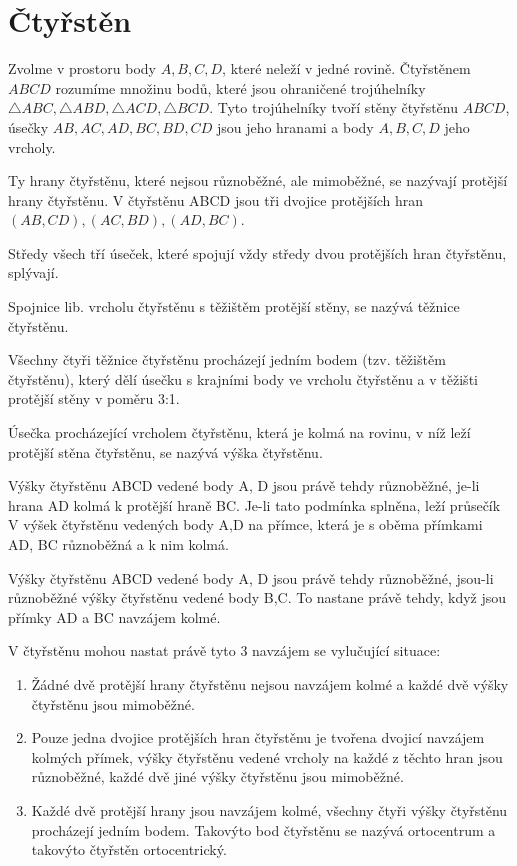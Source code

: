 
\let\braceru=\relax \let\bracelu=\relax 
\def\o#1{\setbox0=
	\hbox{$\kern2pt\overbrace{\kern-2pt#1\kern-2pt}\kern2pt$}\ht0=2.1ex\box0}
\def\to#1{\hbox{#1\rlap{\t{}}}}
\def\rad{\rm{rad}}
\def\f{\frac}
\section{Čtyřstěn}
\Def Zvolme v prostoru body $A,B,C,D$, které neleží
v jedné rovině. Čtyřstěnem $ABCD$ rozumíme
množinu bodů, které jsou ohraničené
trojúhelníky $\triangle ABC , \triangle ABD , \triangle ACD , \triangle BCD$. Tyto
trojúhelníky tvoří stěny čtyřstěnu $ABCD$, úsečky
$AB, AC, AD, BC, BD, CD$ jsou jeho hranami a
body $A,B,C,D$ jeho vrcholy.

\Poz Ty hrany čtyřstěnu, které nejsou různoběžné, ale
mimoběžné, se nazývají protější hrany čtyřstěnu. V čtyřstěnu ABCD jsou tři dvojice
protějších hran $(AB, CD), (AC,BD), (AD,BC)$.

\V Středy všech tří úseček, které spojují vždy středy dvou protějších hran čtyřstěnu,
splývají.

\Def Spojnice lib. vrcholu čtyřstěnu s těžištěm protější stěny, se nazývá těžnice čtyřstěnu.

\V Všechny čtyři těžnice čtyřstěnu procházejí jedním bodem (tzv. těžištěm čtyřstěnu), který
dělí úsečku s krajními body ve vrcholu čtyřstěnu a v těžišti protější stěny v poměru 3:1.

\Def Úsečka procházející vrcholem čtyřstěnu, která je kolmá na rovinu, v níž leží protější stěna
čtyřstěnu, se nazývá výška čtyřstěnu.

\V Výšky čtyřstěnu ABCD vedené body A, D jsou právě tehdy různoběžné, je-li hrana AD
kolmá k protější hraně BC. Je-li tato podmínka splněna, leží průsečík V výšek čtyřstěnu
vedených body A,D na přímce, která je s oběma přímkami AD, BC různoběžná a k nim
kolmá.

\Poz Výšky čtyřstěnu ABCD vedené body A, D jsou právě tehdy různoběžné, jsou-li
různoběžné výšky čtyřstěnu vedené body B,C. To nastane právě tehdy, když jsou přímky
AD a BC navzájem kolmé.

\V V čtyřstěnu mohou nastat právě tyto 3 navzájem se vylučující situace:
\begin{enumerate}
\item Žádné dvě protější hrany čtyřstěnu nejsou navzájem kolmé a každé dvě výšky
čtyřstěnu jsou mimoběžné.
\item Pouze jedna dvojice protějších hran čtyřstěnu je tvořena dvojicí navzájem kolmých
přímek, výšky čtyřstěnu vedené vrcholy na každé z těchto hran jsou různoběžné, každé
dvě jiné výšky čtyřstěnu jsou mimoběžné.
\item Každé dvě protější hrany jsou navzájem kolmé, všechny čtyři výšky čtyřstěnu
procházejí jedním bodem. Takovýto bod čtyřstěnu se nazývá ortocentrum a takovýto
čtyřstěn ortocentrický.
\end{enumerate}
\EndDoc


